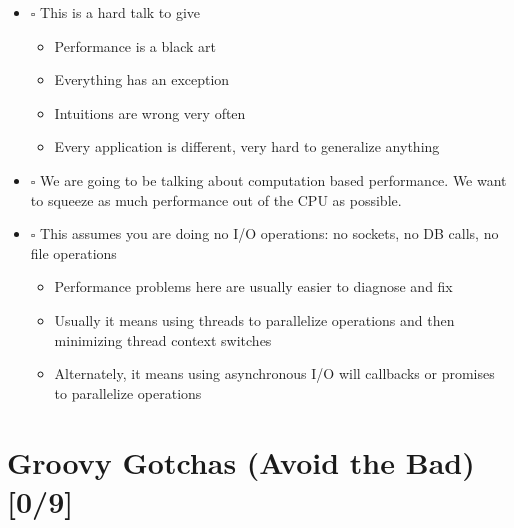 \documentclass[11pt]{article}
\begin{document}
\begin{itemize}
\item $\square$ This is a hard talk to give

\begin{itemize}
\item Performance is a black art

\item Everything has an exception

\item Intuitions are wrong very often

\item Every application is different, very hard to generalize anything
\end{itemize}

\item $\square$ We are going to be talking about computation based performance. We want to squeeze as much performance out of the CPU as possible.

\item $\square$ This assumes you are doing no I/O operations: no sockets, no DB calls, no file operations

\begin{itemize}
\item Performance problems here are usually easier to diagnose and fix

\item Usually it means using threads to parallelize operations and then minimizing thread context switches

\item Alternately, it means using asynchronous I/O will callbacks or promises to parallelize operations
\end{itemize}
\end{itemize}

\section{Groovy Gotchas (Avoid the Bad) [0/9]}
\label{sec:orgheadline4}
\end{document}
